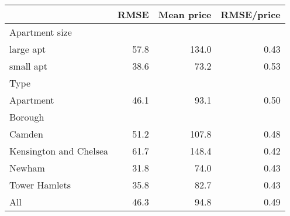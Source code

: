 
\begin{tabular}{lrrr}
\toprule
 & RMSE & Mean price & RMSE/price\\
\midrule
Apartment size &  &  & \\
large apt & 57.8 & 134.0 & 0.43\\
small apt & 38.6 & 73.2 & 0.53\\
Type &  &  & \\
Apartment & 46.1 & 93.1 & 0.50\\
Borough &  &  & \\
Camden & 51.2 & 107.8 & 0.48\\
Kensington and Chelsea & 61.7 & 148.4 & 0.42\\
Newham & 31.8 & 74.0 & 0.43\\
Tower Hamlets & 35.8 & 82.7 & 0.43\\
All & 46.3 & 94.8 & 0.49\\
\bottomrule
\end{tabular}